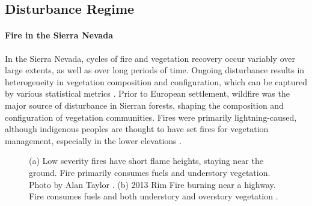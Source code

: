 
\subsection{Disturbance Regime}
\label{distregime}
\paragraph*{Fire in the Sierra Nevada}
In the Sierra Nevada, cycles of fire and vegetation recovery occur variably over large extents, as well as over long periods of time. Ongoing disturbance results in heterogeneity in vegetation composition and configuration, which can be captured by various statistical metrics \citep{Monica2008}. Prior to European settlement, wildfire was the major source of disturbance in Sierran forests, shaping the composition and configuration of vegetation communities. Fires were primarily lightning-caused, although indigenous peoples are thought to have set fires for vegetation management, especially in the lower elevations \citep{Anderson1996}. 

\begin{figure}[!htbp]
  \centering
   \caption{(a) Low severity fires have short flame heights, staying near the ground. Fire primarily consumes fuels and understory vegetation. Photo by Alan Taylor \citep{lowseverityfirephoto}. (b) 2013 Rim Fire burning near a highway. Fire consumes fuels and both understory and overstory vegetation \citep{highseverityphoto}.} 
\label{figs:fireseverity}
\end{figure}

